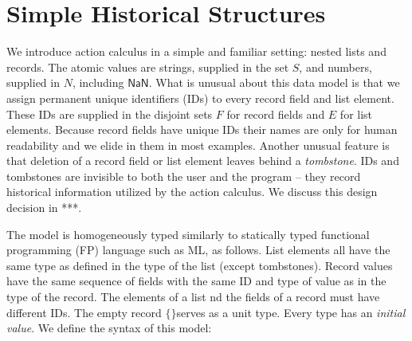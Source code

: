 \documentclass[english,submission]{programming}
\theoremstyle{definition}
\newcommand{\mathbox}[1]{\colorbox{black!10}{$#1$}}
\newcommand{\emptystring}{\textsf{\textquotedbl\ \!\textquotedbl}}
\begin{document}
\section{Simple Historical Structures}

We introduce action calculus in a simple and familiar setting: nested lists and records. The atomic values are strings, supplied in the set \mathbox{S}, and numbers, supplied in \mathbox{N}, including \mathbox{\textsf{NaN}}. What is unusual about this data model is that we assign permanent unique identifiers (IDs) to every record field and list element. These IDs are supplied in the disjoint sets \mathbox{F} for record fields and \mathbox{E} for list elements. Because record fields have unique IDs their names are only for human readability and we elide in them in most examples. Another unusual feature is that deletion of a record field or list element leaves behind a \textit{tombstone}. IDs and tombstones are invisible to both the user and the program -- they record historical information utilized by the action calculus. We discuss this design decision in ***.

The model is homogeneously typed similarly to statically typed functional programming (FP) language such as ML, as follows. List elements all have the same type as defined in the type of the list (except tombstones). Record values have the same sequence of fields with the same ID and type of value as in the type of the record. The elements of a list nd the fields of a record must have different IDs.
The empty record \mathbox{\text{\{\}}}serves as a unit type. Every type has an \textit{initial value}. We define the syntax of this model:

\tcbox{
\[ \begin{array}{r@{\ }l|r@{\ }l|r@{\ }l|l}
  \multicolumn{2}{l|}{\textrm{type}} & \multicolumn{2}{l|}{\textrm{value}} & \multicolumn{2}{l|}{\textrm{initial value}}&\\
  \hline
  T \Coloneqq & & v \Coloneqq & & T^\varnothing = & &\\
  &  \textsf{String} & & S & & \emptystring & \textrm{string}\\
  & \textsf{Number} & &  N & & \textsf{NaN} & \textrm{number}\\
  & \textsf{List } T & & [ E : v \  \dots ] & & [] & \textrm{list}\\
  & \{ F \  S : T \  \dots \} & & \{ F : v \  \dots \} & & \{ F : T^\varnothing \  \dots \}& \textrm{record}\\

  & \bot && \bigtimes & & \bigtimes & \textrm{tombstone}\\
\end{array}\]
}
\end{document}
